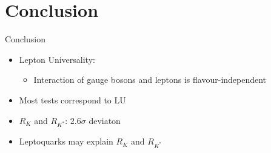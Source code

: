 \section{Conclusion}
\frame{\tableofcontents[currentsection]}
\begin{frame}{Conclusion}
    \begin{itemize}
        \item Lepton Universality:
        \begin{itemize}
            \item Interaction of gauge bosons and leptons is flavour-independent \medskip
        \end{itemize}
        \item Most tests correspond to LU \medskip
        \item $R_{K}$ and $R_{K^*}$: $2.6 \sigma$ deviaton \medskip
        \item Leptoquarks may explain $R_{K}$ and $R_{K^*}$ \medskip
    \end{itemize}
\end{frame}